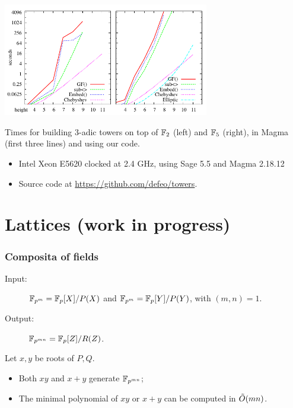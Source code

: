 \documentclass[12pt]{beamer}
\begin{document}
\begin{frame}
  \frametitle{\insertsection}
  
  \begin{center}
    \includegraphics[width=9cm]{creat}\\\vspace*{1mm}
    \parbox{7cm}{\scriptsize Times for building $3$-adic towers on top of $\mathbb{F}_2$ (left)
      and $\mathbb{F}_5$ (right), in Magma (first three lines) and using our code.}
  \end{center}
  
  \begin{itemize}
    \small
  \item Intel Xeon E5620 clocked at 2.4 GHz, using Sage 5.5 and Magma 2.18.12
  \item Source code at \url{https://github.com/defeo/towers}.
  \end{itemize}
\end{frame}


\section{Lattices (work in progress)}
\frame{\sectionpage}


\begin{frame}
  \frametitle{Composita of fields}

  \begin{description}
  \item[Input:] \alert{$\mathbb{F}_{p^m}=\mathbb{F}_{p}[X]/P(X)$} and
    \alert{$\mathbb{F}_{p^m}=\mathbb{F}_{p}[Y]/P(Y)$}, with $(m,n)=1$.
  \item[Output:] \alert{$\mathbb{F}_{p^{mn}}=\mathbb{F}_{p}[Z]/R(Z)$}.
  \end{description}

  \begin{theorem}
    Let \emph{$x,y$} be roots of \emph{$P,Q$}. 
    \begin{itemize}
    \item Both $xy$ and $x+y$ generate $\mathbb{F}_{p^{mn}}$;
    \item The minimal polynomial of $xy$ or $x+y$ can be computed in
      \alert{$\tilde{O}(mn)$}.
    \end{itemize}
  \end{theorem}
\end{frame}
\end{document}
